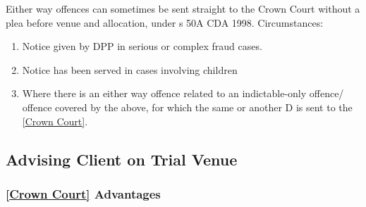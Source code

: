 \documentclass[
]{article}
\providecommand{\tightlist}{%
  \setlength{\itemsep}{0pt}\setlength{\parskip}{0pt}}
\begin{document}
Either way offences can sometimes be sent straight to the Crown Court
without a plea before venue and allocation, under s 50A CDA 1998.
Circumstances:

\begin{enumerate}
\def\labelenumi{\arabic{enumi}.}
\tightlist
\item
  Notice given by DPP in serious or complex fraud cases.
\item
  Notice has been served in cases involving children
\item
  Where there is an either way offence related to an indictable-only
  offence/ offence covered by the above, for which the same or another D
  is sent to the \href{no\%20financial\%20limit.}{{[}Crown Court{]}}.
\end{enumerate}

\hypertarget{advising-client-on-trial-venue}{%
\subsection{Advising Client on Trial
Venue}\label{advising-client-on-trial-venue}}

\hypertarget{crown-court-advantages}{%
\subsubsection{\texorpdfstring{\href{no\%20financial\%20limit.}{{[}Crown
Court{]}}
Advantages}{{[}Crown Court{]} Advantages}}\label{crown-court-advantages}}
\end{document}
